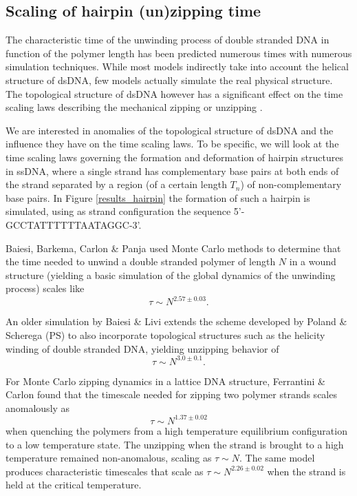 \subsection{Scaling of hairpin (un)zipping time}

The characteristic time of the unwinding process of double stranded DNA in function of the polymer length has been predicted numerous times with numerous simulation techniques. While most models indirectly take into account the helical structure of dsDNA, few models actually simulate the real physical structure. The topological structure of dsDNA however has a significant effect on the time scaling laws describing the mechanical zipping or unzipping \cite{carlon2010unwinding}.

We are interested in anomalies of the topological structure of dsDNA and the influence they have on the time scaling laws. To be specific, we will look at the time scaling laws governing the formation and deformation of hairpin structures in ssDNA, where a single strand has complementary base pairs at both ends of the strand separated by a region (of a certain length $T_n$) of non-complementary base pairs. In Figure \ref{results_hairpin} the formation of such a hairpin is simulated, using as strand configuration the sequence 5'-GCCTATTTTTTAATAGGC-3'. 

Baiesi, Barkema, Carlon \& Panja \cite{carlon2010unwinding} used Monte Carlo methods to determine that the time needed to unwind a double stranded polymer of length $N$ in a wound structure (yielding a basic simulation of the global dynamics of the unwinding process) scales like
\begin{equation}
\tau \sim N^{2.57\pm 0.03}.
\end{equation}

An older simulation by Baiesi \& Livi \cite{baiesi2009multiple} extends the scheme developed by Poland \& Scherega (PS) \cite{poland1966phase} to also incorporate topological structures such as the helicity winding of double stranded DNA, yielding unzipping behavior of
\begin{equation}
\tau \sim N^{3.0\pm 0.1}.
\end{equation}

For Monte Carlo zipping dynamics in a lattice DNA structure, Ferrantini \& Carlon \cite{carlon2011anomalous} found that the timescale needed for zipping two polymer strands scales anomalously as
\begin{equation}
\tau \sim N^{1.37\pm0.02}
\end{equation}
when quenching the polymers from a high temperature equilibrium configuration to a low temperature state. The unzipping when the strand is brought to a high temperature remained non-anomalous, scaling as $\tau \sim N$. The same model produces characteristic timescales that scale as $\tau \sim N^{2.26 \pm 0.02}$ when the strand is held at the critical temperature.



